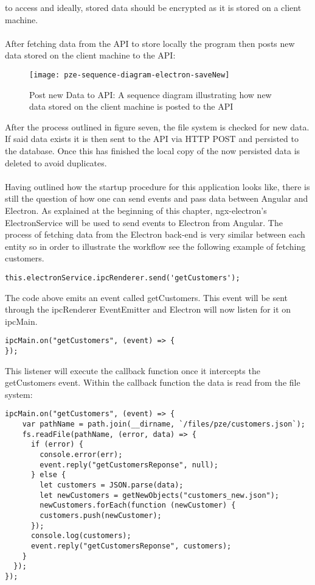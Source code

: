 to access and ideally, stored data should be encrypted as it is stored on a client machine.\paragraph{}
After fetching data from the API to store locally the program then posts new data stored on the 
client machine to the API:
\begin{figure}[H]
  \centering
  \label{fig:pze-sequence-diagram-electron-saveNew}
  \texttt{[image: pze-sequence-diagram-electron-saveNew]}
  \caption{Post new Data to API:
  A sequence diagram illustrating how new data stored on the client machine is posted to the API}
\end{figure}
After the process outlined in figure seven, the file system is checked for new data. 
If said data exists it is then sent to the API via HTTP POST and persisted to the database.
Once this has finished the local copy of the now persisted data is deleted to avoid duplicates.\paragraph{}
Having outlined how the startup procedure for this application looks like, there is still the question of 
how one can send events and pass data between Angular and Electron.
As explained at the beginning of this chapter, ngx-electron's ElectronService will be used to send events 
to Electron from Angular. 
The process of fetching data from the Electron back-end is very similar between each entity so 
in order to illustrate the workflow see the following example of fetching customers.
\begin{lstlisting}[caption=Sending an event using ElectronService]
  this.electronService.ipcRenderer.send('getCustomers');
\end{lstlisting}
The code above emits an event called getCustomers. 
This event will be sent through the ipcRenderer EventEmitter and Electron will now listen 
for it on ipcMain.
\begin{lstlisting}[caption=Listening for an event]
  ipcMain.on("getCustomers", (event) => {
});
\end{lstlisting}
This listener will execute the callback function once it intercepts the getCustomers event. 
Within the callback function the data is read from the file system:
\begin{lstlisting}[caption=Reading data in event callback function]
  ipcMain.on("getCustomers", (event) => {
    var pathName = path.join(__dirname, `/files/pze/customers.json`);
    fs.readFile(pathName, (error, data) => {
      if (error) {
        console.error(err);
        event.reply("getCustomersReponse", null);
      } else {
        let customers = JSON.parse(data);
        let newCustomers = getNewObjects("customers_new.json");
        newCustomers.forEach(function (newCustomer) {
        customers.push(newCustomer);
      });
      console.log(customers);
      event.reply("getCustomersReponse", customers);
    }
  });
});
\end{lstlisting}
